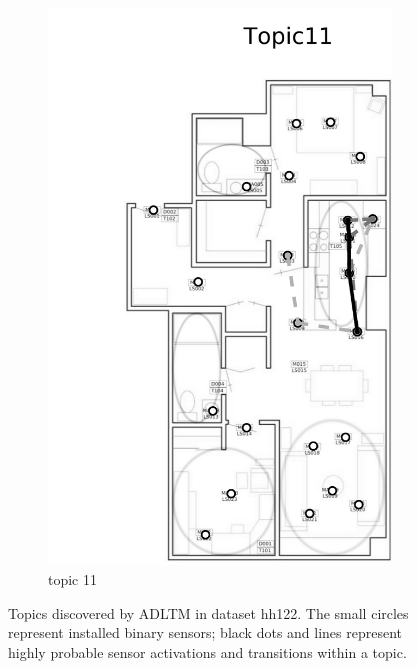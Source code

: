 \documentclass{article}
\begin{document}
\begin{figure}[!t]
\begin{subfigure}{0.32\linewidth}
    \includegraphics[width=\linewidth]{figures/adl_tm/topic11_bw_cp}
    \caption{topic 11}
    \label{fig:adl_tm-11}
\end{subfigure}
\caption{Topics discovered by \ac{ADLTM} in dataset hh122. The small circles represent installed binary sensors; black dots and lines represent highly probable sensor activations and transitions within a topic.}
\label{fig:adl_tm}
\end{figure}
\end{document}
